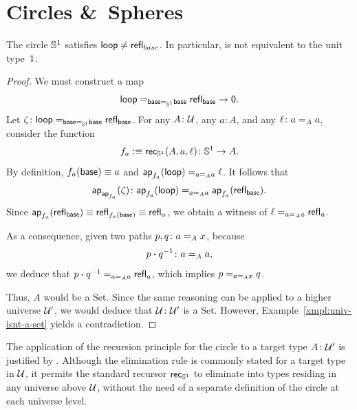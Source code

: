 \section{Circles \texorpdfstring{\&}{and}\ Spheres}

\begin{lem}
    The circle\/ $\mathbb S^1$ satisfies $\mathsf{loop}\ne\mathsf{refl}_{base}$. In particular, is not equivalent to the unit type\/~$\mathsf{1}$.
\end{lem}

\begin{proof}
    We must construct a map
    \[
        \mathsf{loop}
            \mathrel{=_{\mathsf{base}\mathrel{=_{\mathbb S^1}}\mathsf{base}}}
            \mathsf{refl}_{\mathsf{base}}
        \to\mathsf{0}.
    \]
    Let $\zeta\colon\fun{loop}\eq{\fun{base}\eq{\sphere^1}\fun{base}}\fun{refl}_{\fun{base}}$. For any $A\colon\univ$, any $a\colon A$, and any $\ell\colon a\eq Aa$, consider the function
    \[
        f_a\defeq
            \fun{rec}_{\sphere^1}(A,a,\ell)
            \colon\sphere^1\to A.
    \]
    By definition, $f_a(\mathsf{base})\equiv a$ and $\mathsf{ap}_{f_a}(\mathsf{loop})\mathrel{=_{a\mathrel{=_{A}}a}}\ell$. It follows that
    \[
        \fun{ap}_{\fun{ap}_{f_a}}(\zeta)\colon
            \fun{ap}_{f_a}(\fun{loop})
            \eq{a\eq Aa}
            \fun{ap}_{f_a}(\fun{refl}_{\fun{base}}).
    \]
    Since $\mathsf{ap}_{f_a}(\mathsf{refl}_{\mathsf{base}})\equiv\mathsf{refl}_{f_a(\mathsf{base})}\equiv\mathsf{refl}_a$, we obtain a witness of $\ell\mathrel{=_{a\mathrel{=_{A}}a}}\mathsf{refl}_a$.

    As a consequence, given two paths $p,q\colon a\eq Ax$, because
    \[
        p\ct q^{-1}\colon a\eq Aa,
    \]
    we deduce that $p\mathbin{\boldsymbol{\cdot}} q^{-1}\mathrel{=_{a\mathrel{=_{A}}a}}\mathsf{refl}_a$, which implies $p\mathrel{=_{a\mathrel{=_{A}}x}}q$.

    Thus, $A$ would be a Set. Since the same reasoning can be applied to a higher universe $\mathcal U'$, we would deduce that $\univ\colon\univ'$ is a Set. However, Example~\ref{xmpl:univ-isnt-a-set} yields a contradiction.
\end{proof}

\begin{rem}
    The application of the recursion principle for the circle to a target type $A\colon\univ'$ is justified by . Although the elimination rule is commonly stated for a target type in $\mathcal U$, it permits the standard recursor $\mathsf{rec}_{\mathbb S^1}$ to eliminate into types residing in any universe above $\mathcal U$, without the need of a separate definition of the circle at each universe level.
\end{rem}

